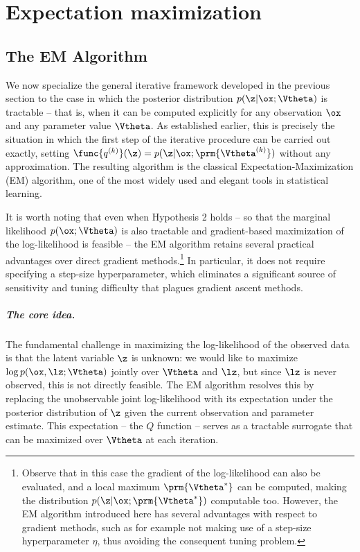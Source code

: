 
\chapter{Expectation maximization}
\section*{The EM Algorithm}

We now specialize the general iterative framework developed in the previous section to the case in which the posterior distribution $p(\z|\ox;\Vtheta)$ is tractable -- that is, when it can be computed explicitly for any observation $\ox$ and any parameter value $\Vtheta$. As established earlier, this is precisely the situation in which the first step of the iterative procedure can be carried out exactly, setting $\func{q^{(k)}}(\z) = p(\z|\ox;\prm{\Vtheta^{(k)}})$ without any approximation. The resulting algorithm is the classical \alert{Expectation-Maximization} (EM) algorithm, one of the most widely used and elegant tools in statistical learning.

It is worth noting that even when Hypothesis 2 holds -- so that the marginal likelihood $p(\ox;\Vtheta)$ is also tractable and gradient-based maximization of the log-likelihood is feasible -- the EM algorithm retains several practical advantages over direct gradient methods.\footnote{Observe that in this case the gradient of the log-likelihood can also be evaluated, and a local maximum $\prm{\Vtheta^*}$ can be computed, making the distribution $p(\z|\ox;\prm{\Vtheta^*})$ computable too. However, the EM algorithm introduced here has several advantages with respect to gradient methods, such as for example not making use of a step-size hyperparameter $\eta$, thus avoiding the consequent tuning problem.} In particular, it does not require specifying a step-size hyperparameter, which eliminates a significant source of sensitivity and tuning difficulty that plagues gradient ascent methods.

\paragraph{The core idea.} The fundamental challenge in maximizing the log-likelihood of the observed data is that the latent variable $\z$ is unknown: we would like to maximize $\log p(\ox,\lz;\Vtheta)$ jointly over $\Vtheta$ and $\lz$, but since $\lz$ is never observed, this is not directly feasible. The EM algorithm resolves this by replacing the unobservable joint log-likelihood with its expectation under the posterior distribution of $\z$ given the current observation and parameter estimate. This expectation -- the $Q$ function -- serves as a tractable surrogate that can be maximized over $\Vtheta$ at each iteration.

